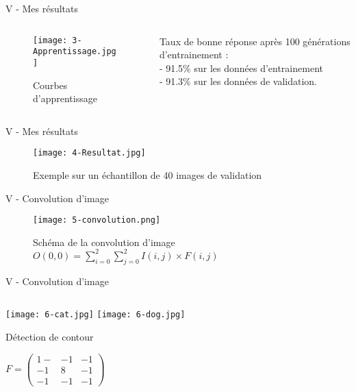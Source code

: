 \begin{frame}{V - Mes résultats}
	\begin{columns}[T] %
		\begin{column}{.52\textwidth}
			\begin{figure}
				\centering
				\texttt{[image: 3-Apprentissage.jpg]}
				\caption{Courbes d'apprentissage}
			\end{figure}
		\end{column}
		\hfill
		\begin{column}{.50\textwidth}
			\bigskip	\bigskip	\bigskip
			\bigskip	\bigskip	\bigskip
			\bigskip	\bigskip	\bigskip
			Taux de bonne réponse après 100 générations d'entrainement : \\
			- 91.5\% sur les données d'entrainement \\
			- 91.3\% sur les données de validation. \\
		\end{column}%
	\end{columns}
\end{frame}


\begin{frame}{V - Mes résultats}
	\begin{figure}
		\centering
		\texttt{[image: 4-Resultat.jpg]}
		\caption{Exemple sur un échantillon de 40 images de validation}
	\end{figure}
\end{frame}


\begin{frame}{V - Convolution d'image}
	\begin{figure}
		\centering
		\texttt{[image: 5-convolution.png]}
		\caption{Schéma de la convolution d'image $O(0, 0) = \sum_{i=0}^{2}\sum_{j=0}^{2}I(i, j)\times F(i, j)$}
	\end{figure}
\end{frame}


\begin{frame}{V - Convolution d'image}
	\begin{columns}[T] %
		\begin{column}{.4\textwidth}
			\texttt{[image: 6-cat.jpg]}
			\texttt{[image: 6-dog.jpg]}
			\begin{exampleblock}{Détection de contour}
				\begin{center}
					\centering
					$
					F =
					\begin{pmatrix}
						1- & -1 & -1 \\
						-1 & 8  & -1 \\
						-1 & -1 & -1
					\end{pmatrix}
					$
				\end{center}
			\end{exampleblock}
		\end{column}
		\hfill
		\begin{column}{.58\textwidth}
			
		\end{column}
	\end{columns}
\end{frame}


